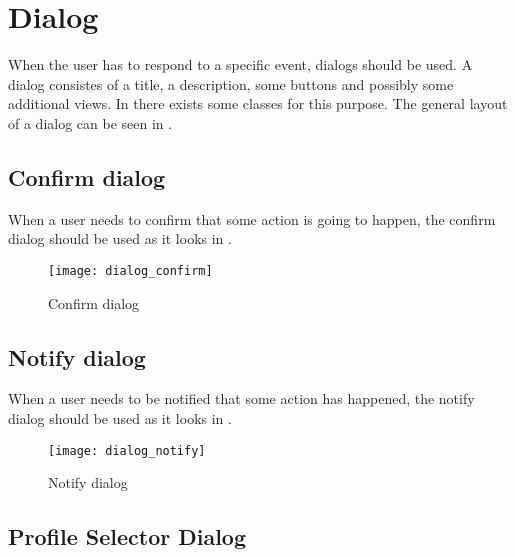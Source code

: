 
\chapter{Dialog}
\label{cha:dialog}

When the user has to respond to a specific event, dialogs should be used. A dialog consistes of a title, a description, some buttons and possibly some additional views. In \gc there exists some classes for this purpose. The general layout of a dialog can be seen in .

\section{Confirm dialog}
\label{sec:confirm_dialog}

When a user needs to confirm that some action is going to happen, the confirm dialog should be used as it looks in . 

\begin{figure}[h]
	\centering
	\texttt{[image: dialog\_confirm]}
	\caption{Confirm dialog}
	\label{fig:confirm_dialog}
\end{figure}
\FloatBarrier

\section{Notify dialog}
\label{sec:notify_dialog}

When a user needs to be notified that some action has happened, the notify dialog should be used as it looks in . 

\begin{figure}[h]
	\centering
	\texttt{[image: dialog\_notify]}
	\caption{Notify dialog}
	\label{fig:notify_dialog}
\end{figure}
\FloatBarrier

\section{Profile Selector Dialog}
\label{sec:profileselector_dialog}

